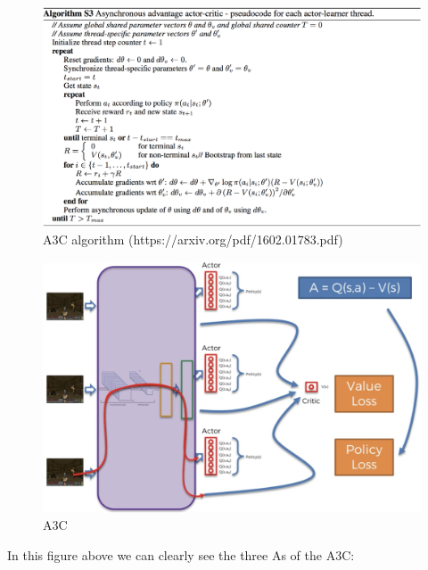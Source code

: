 \documentclass[]{book}
\begin{document}
\begin{figure}[!htbp]
        \begin{center}
            \includegraphics[scale=0.4]{S3}
            \caption{A3C algorithm (https://arxiv.org/pdf/1602.01783.pdf)}
        \end{center}
\end{figure}

\begin{figure}[!htbp]
        \begin{center}
            \includegraphics[scale=0.4]{A3C}
            \caption{A3C}
        \end{center}
\end{figure}

In this figure above we can clearly see the three As of the A3C:
\end{document}
